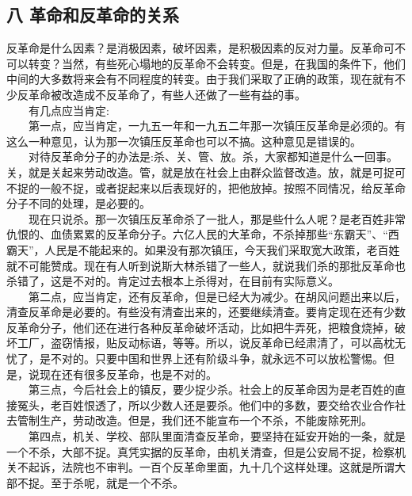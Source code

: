 \documentclass[cn,11pt,chinese]{elegantbook}
\def\myformat#1{\hfil\hfil #1}
\begin{document}
\subsection*{\myformat{八 革命和反革命的关系}}
反革命是什么因素？是消极因素，破坏因素，是积极因素的反对力量。反革命可不可以转变？当然，有些死心塌地的反革命不会转变。但是，在我国的条件下，他们中间的大多数将来会有不同程度的转变。由于我们采取了正确的政策，现在就有不少反革命被改造成不反革命了，有些人还做了一些有益的事。\\
　　有几点应当肯定:\\
　　第一点，应当肯定，一九五一年和一九五二年那一次镇压反革命是必须的。有这么一种意见，认为那一次镇压反革命也可以不搞。这种意见是错误的。\\
　　对待反革命分子的办法是:杀、关、管、放。杀，大家都知道是什么一回事。关，就是关起来劳动改造。管，就是放在社会上由群众监督改造。放，就是可捉可不捉的一般不捉，或者捉起来以后表现好的，把他放掉。按照不同情况，给反革命分子不同的处理，是必要的。\\
　　现在只说杀。那一次镇压反革命杀了一批人，那是些什么人呢？是老百姓非常仇恨的、血债累累的反革命分子。六亿人民的大革命，不杀掉那些“东霸天”、“西霸天”，人民是不能起来的。如果没有那次镇压，今天我们采取宽大政策，老百姓就不可能赞成。现在有人听到说斯大林杀错了一些人，就说我们杀的那批反革命也杀错了，这是不对的。肯定过去根本上杀得对，在目前有实际意义。\\
　　第二点，应当肯定，还有反革命，但是已经大为减少。在胡风问题出来以后，清查反革命是必要的。有些没有清查出来的，还要继续清查。要肯定现在还有少数反革命分子，他们还在进行各种反革命破坏活动，比如把牛弄死，把粮食烧掉，破坏工厂，盗窃情报，贴反动标语，等等。所以，说反革命已经肃清了，可以高枕无忧了，是不对的。只要中国和世界上还有阶级斗争，就永远不可以放松警惕。但是，说现在还有很多反革命，也是不对的。\\
　　第三点，今后社会上的镇反，要少捉少杀。社会上的反革命因为是老百姓的直接冤头，老百姓恨透了，所以少数人还是要杀。他们中的多数，要交给农业合作社去管制生产，劳动改造。但是，我们还不能宣布一个不杀，不能废除死刑。\\
　　第四点，机关、学校、部队里面清查反革命，要坚持在延安开始的一条，就是一个不杀，大部不捉。真凭实据的反革命，由机关清查，但是公安局不捉，检察机关不起诉，法院也不审判。一百个反革命里面，九十几个这样处理。这就是所谓大部不捉。至于杀呢，就是一个不杀。\\
\end{document}
